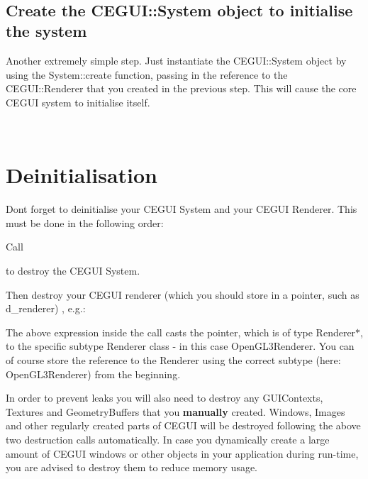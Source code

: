 ~\newline
 \hypertarget{rendering_tutorial_rendering_tutorial_system}{}\subsection{Create the C\+E\+G\+U\+I\+::\+System object to initialise the system}\label{rendering_tutorial_rendering_tutorial_system}
Another extremely simple step. Just instantiate the C\+E\+G\+U\+I\+::\+System object by using the System\+::create function, passing in the reference to the C\+E\+G\+U\+I\+::\+Renderer that you created in the previous step. This will cause the core C\+E\+G\+UI system to initialise itself. 
\begin{DoxyCode}{0}
\end{DoxyCode}


~\newline
 \hypertarget{rendering_tutorial_Deinitialisation}{}\section{Deinitialisation}\label{rendering_tutorial_Deinitialisation}
Don\textquotesingle{}t forget to deinitialise your C\+E\+G\+UI System and your C\+E\+G\+UI Renderer. This must be done in the following order\+:
\begin{DoxyEnumerate}
\item Call
\begin{DoxyCode}{0}
\end{DoxyCode}
 to destroy the C\+E\+G\+UI System.
\item Then destroy your C\+E\+G\+UI renderer (which you should store in a pointer, such as d\+\_\+renderer) , e.\+g.\+: 
\begin{DoxyCode}{0}
\end{DoxyCode}

\end{DoxyEnumerate}

The above expression inside the call casts the pointer, which is of type Renderer$\ast$, to the specific subtype Renderer class -\/ in this case Open\+G\+L3\+Renderer. You can of course store the reference to the Renderer using the correct subtype (here\+: Open\+G\+L3\+Renderer) from the beginning.

In order to prevent leaks you will also need to destroy any G\+U\+I\+Contexts, Textures and Geometry\+Buffers that you {\bfseries{manually}} created. Windows, Images and other regularly created parts of C\+E\+G\+UI will be destroyed following the above two destruction calls automatically. In case you dynamically create a large amount of C\+E\+G\+UI windows or other objects in your application during run-\/time, you are advised to destroy them to reduce memory usage.

